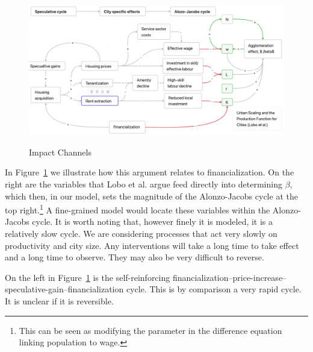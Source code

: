 {\newpage\thispagestyle{empty}
\vspace{-1.5cm}
\begin{figure}
\vspace{-1cm}
\caption{Impact Channels}
\begin{adjustwidth}{-0.24\textwidth}{-0.24\textwidth}
    \centering
    \includegraphics[scale=.45, angle=90]{fig/impact_channels_revised.png}
    \label{fig-impact-channels}
\end{adjustwidth}
\end{figure}
}


 In Figure~\ref{fig-impact-channels} we illustrate how this argument relates to financialization. On the right are the variables that  Lobo et al.\cite{loboUrbanScalingProduction2013} argue feed directly into determining $\beta$, which then, in our model, sets the magnitude of the \gls{Alonzo-Jacobs cycle} at the top right.\footnote{This can be seen as modifying  the parameter in  the difference equation linking population to wage.} A fine-grained model would locate these variables within the Alonzo-Jacobs cycle. It is worth noting that, however finely it is modeled, it is  a relatively slow cycle. We are considering processes that act very slowly on productivity and city size. Any interventions will take a long time to take effect and a long time to observe. They may also be very difficult to reverse. 
 
 
 On the left in Figure~\ref{fig-impact-channels} is the self-reinforcing financialization--price-increase-- speculative-gain--financialization cycle. This is by comparison a very rapid cycle. It is unclear if it is reversible. 
 
